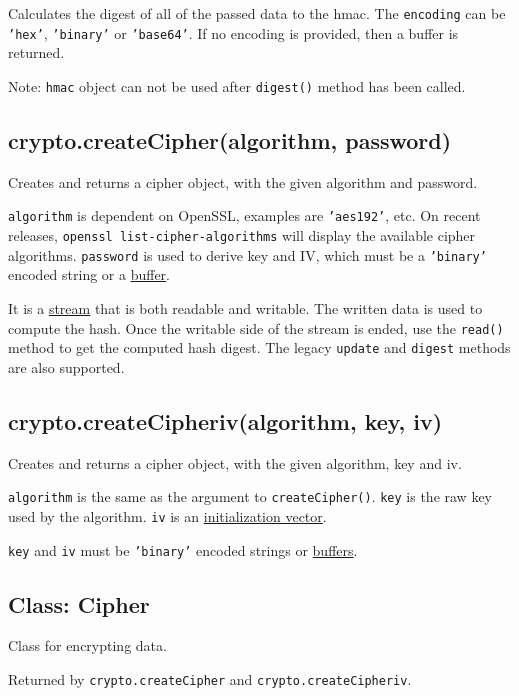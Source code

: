 Calculates the digest of all of the passed data to the hmac. The
\texttt{encoding} can be \texttt{'hex'}, \texttt{'binary'} or
\texttt{'base64'}. If no encoding is provided, then a buffer is
returned.

Note: \texttt{hmac} object can not be used after \texttt{digest()}
method has been called.

\subsection{crypto.createCipher(algorithm, password)}

Creates and returns a cipher object, with the given algorithm and
password.

\texttt{algorithm} is dependent on OpenSSL, examples are
\texttt{'aes192'}, etc. On recent releases,
\texttt{openssl list-cipher-algorithms} will display the available
cipher algorithms. \texttt{password} is used to derive key and IV, which
must be a \texttt{'binary'} encoded string or a
\href{buffer.html}{buffer}.

It is a \href{stream.html}{stream} that is both readable and writable.
The written data is used to compute the hash. Once the writable side of
the stream is ended, use the \texttt{read()} method to get the computed
hash digest. The legacy \texttt{update} and \texttt{digest} methods are
also supported.

\subsection{crypto.createCipheriv(algorithm, key, iv)}

Creates and returns a cipher object, with the given algorithm, key and
iv.

\texttt{algorithm} is the same as the argument to
\texttt{createCipher()}. \texttt{key} is the raw key used by the
algorithm. \texttt{iv} is an
\href{http://en.wikipedia.org/wiki/Initialization\_vector}{initialization
vector}.

\texttt{key} and \texttt{iv} must be \texttt{'binary'} encoded strings
or \href{buffer.html}{buffers}.

\subsection{Class: Cipher}

Class for encrypting data.

Returned by \texttt{crypto.createCipher} and
\texttt{crypto.createCipheriv}.

